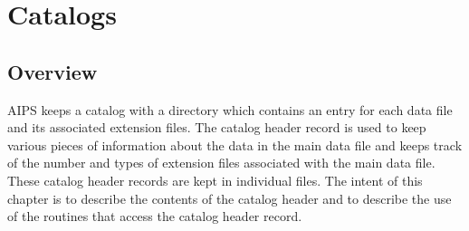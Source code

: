 \chapter{Catalogs}
\setcounter{page}{1}

\section{Overview}
AIPS keeps a catalog with a directory which contains an entry  for
each data file and its associated extension files. The catalog header
record is used to keep various pieces of information about the data in
the main data file and keeps track of the number and types of
extension files associated with the main data file.  These catalog
header records are kept in individual files. The intent of this
chapter is to describe the contents of the catalog header and to
describe the use of the routines that access the catalog header
record.

